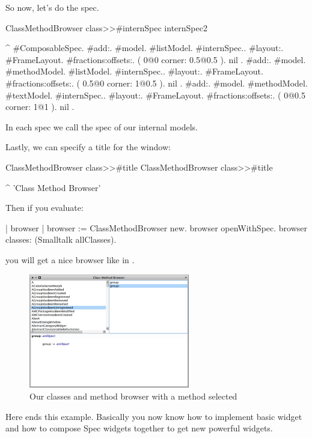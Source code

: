 \documentclass[a4paper,10pt,twoside]{book}
\begin{document}
So now, let's do the spec. 
\begin{method}{ClassMethodBrowser class>>\#internSpec}
internSpec2

	^ { #ComposableSpec.
			#add:. {{#model. #listModel. #internSpec.}.
						#layout:. {#FrameLayout.
									#fractions:offsets:. 	( 0@0 corner: 0.5@0.5 ). nil }}.
			#add:. {{#model. #methodModel.  #listModel. #internSpec.}.
						#layout:. {#FrameLayout.
									#fractions:offsets:. 	( 0.5@0 corner: 1@0.5 ). nil }}.
			#add:. {{#model. #methodModel.  #textModel. #internSpec.}.
						#layout:. {#FrameLayout.
									#fractions:offsets:. 	( 0@0.5 corner: 1@1 ). nil }}}.
\end{method}
In each spec we call the spec of our internal models.

Lastly, we can specify a title for the window:
\begin{method}{ClassMethodBrowser class>>\#title}
ClassMethodBrowser class>>#title

	^ 'Class Method Browser'
\end{method}

Then if you evaluate:

\begin{code}{}
| browser |
browser := ClassMethodBrowser new.
browser openWithSpec.
browser classes: (Smalltalk allClasses).
\end{code}

you will get a nice browser like in .


\begin{figure}[ht]
\begin{center}
	\includegraphics[width=7cm]{MethodBrowser6}
	\caption{Our classes and method browser with a method selected}
\end{center}
\end{figure}


Here ends this example. 
Basically you now know how to implement basic widget and how to compose Spec widgets together to get new powerful widgets.
\end{document}
